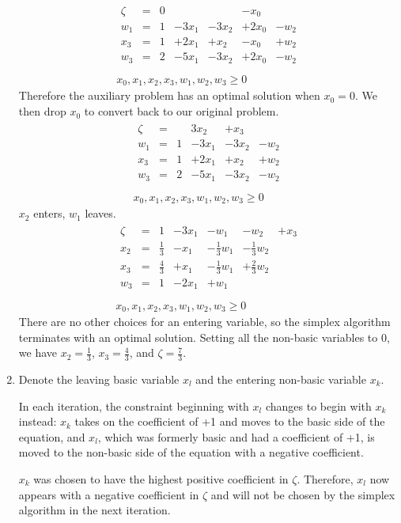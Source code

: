 \documentclass[12pt]{article}
\begin{document}
\begin{enumerate}
%
\begin{eqnarray*}
\begin{array}{lllllll}
\zeta & = & 0 & & & -x_0 & \\
w_1 & = & 1 & -3x_1  & -3x_2 & +2x_0 & -w_2\\
x_3 & = & 1 & +2x_1 & +x_2 & -x_0  & +w_2\\
w_3 & = & 2 & -5x_1  & -3x_2 & +2x_0 & -w_2\\
\end{array}\\
x_0,x_1,x_2,x_3,w_1,w_2,w_3 \ge 0
\end{eqnarray*}
%
Therefore the auxiliary problem has an optimal solution when $x_0 = 0$.
We then drop $x_0$ to convert back to our original problem.
%
\begin{eqnarray*}
\begin{array}{llllll}
\zeta & = & & 3x_2 & +x_3 & \\
w_1 & = & 1 & -3x_1  & -3x_2 & -w_2\\
x_3 & = & 1 & +2x_1 & +x_2 & +w_2\\
w_3 & = & 2 & -5x_1  & -3x_2 & -w_2\\
\end{array}\\
x_0,x_1,x_2,x_3,w_1,w_2,w_3 \ge 0
\end{eqnarray*}
%
$x_2$ enters, $w_1$ leaves.
%
\begin{eqnarray*}
\begin{array}{lllllll}
\zeta & = & 1 & -3x_1 & -w_1 & -w_2 & +x_3 \\
x_2 & = & \frac{1}{3} & -x_1 & -\frac{1}{3}w_1 & -\frac{1}{3}w_2 &\\
x_3 & = & \frac{4}{3} & +x_1 & -\frac{1}{3}w_1 & +\frac{2}{3}w_2 &\\
w_3 & = & 1 & -2x_1  & +w_1 & &\\
\end{array}\\
x_0,x_1,x_2,x_3,w_1,w_2,w_3 \ge 0
\end{eqnarray*}
%
There are no other choices for an entering variable, so the simplex
algorithm terminates with an optimal solution. Setting all the
non-basic variables to 0, we have $x_2 = \frac{1}{3}$, $x_3 = \frac{4}{3}$, and
$\zeta = \frac{7}{3}$.

\item %
Denote the leaving basic variable $x_l$ and the
entering non-basic variable $x_k$.

In each iteration, the constraint beginning with $x_l$ changes to begin
with $x_k$ instead:
$x_k$ takes on the
coefficient of +1 and moves to the basic side of the equation, and
$x_l$, which was formerly basic and had a coefficient of
+1, is moved to the non-basic side of the equation with a negative coefficient.

$x_k$ was chosen to have the highest positive coefficient in $\zeta$.
Therefore, $x_l$ now appears with a negative coefficient in $\zeta$ and
will not be chosen by the simplex algorithm in the next iteration.

\end{enumerate}
\end{document}

